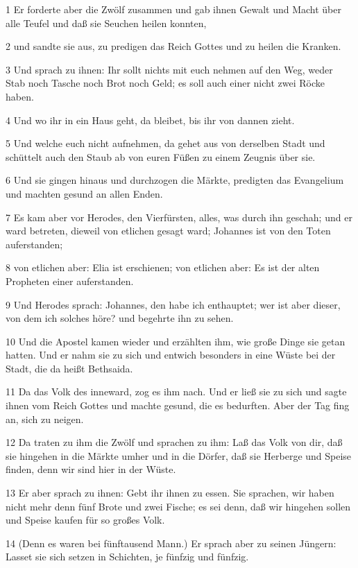\par 1 Er forderte aber die Zwölf zusammen und gab ihnen Gewalt und Macht über alle Teufel und daß sie Seuchen heilen konnten,
\par 2 und sandte sie aus, zu predigen das Reich Gottes und zu heilen die Kranken.
\par 3 Und sprach zu ihnen: Ihr sollt nichts mit euch nehmen auf den Weg, weder Stab noch Tasche noch Brot noch Geld; es soll auch einer nicht zwei Röcke haben.
\par 4 Und wo ihr in ein Haus geht, da bleibet, bis ihr von dannen zieht.
\par 5 Und welche euch nicht aufnehmen, da gehet aus von derselben Stadt und schüttelt auch den Staub ab von euren Füßen zu einem Zeugnis über sie.
\par 6 Und sie gingen hinaus und durchzogen die Märkte, predigten das Evangelium und machten gesund an allen Enden.
\par 7 Es kam aber vor Herodes, den Vierfürsten, alles, was durch ihn geschah; und er ward betreten, dieweil von etlichen gesagt ward; Johannes ist von den Toten auferstanden;
\par 8 von etlichen aber: Elia ist erschienen; von etlichen aber: Es ist der alten Propheten einer auferstanden.
\par 9 Und Herodes sprach: Johannes, den habe ich enthauptet; wer ist aber dieser, von dem ich solches höre? und begehrte ihn zu sehen.
\par 10 Und die Apostel kamen wieder und erzählten ihm, wie große Dinge sie getan hatten. Und er nahm sie zu sich und entwich besonders in eine Wüste bei der Stadt, die da heißt Bethsaida.
\par 11 Da das Volk des inneward, zog es ihm nach. Und er ließ sie zu sich und sagte ihnen vom Reich Gottes und machte gesund, die es bedurften. Aber der Tag fing an, sich zu neigen.
\par 12 Da traten zu ihm die Zwölf und sprachen zu ihm: Laß das Volk von dir, daß sie hingehen in die Märkte umher und in die Dörfer, daß sie Herberge und Speise finden, denn wir sind hier in der Wüste.
\par 13 Er aber sprach zu ihnen: Gebt ihr ihnen zu essen. Sie sprachen, wir haben nicht mehr denn fünf Brote und zwei Fische; es sei denn, daß wir hingehen sollen und Speise kaufen für so großes Volk.
\par 14 (Denn es waren bei fünftausend Mann.) Er sprach aber zu seinen Jüngern: Lasset sie sich setzen in Schichten, je fünfzig und fünfzig.

